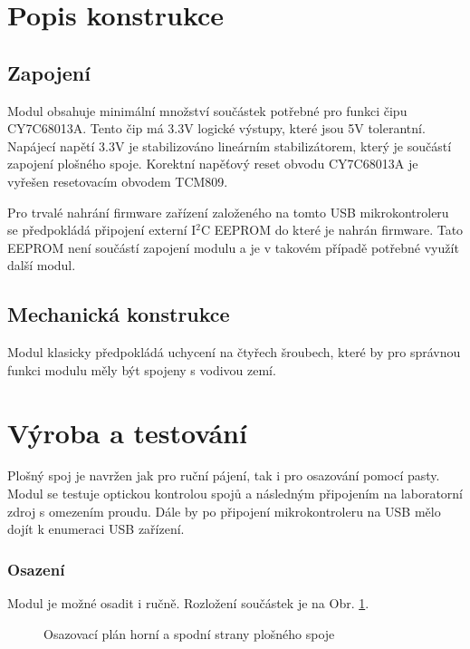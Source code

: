 \documentclass[12pt,a4paper,oneside]{article}
\begin{document}
\section{Popis konstrukce}

\subsection{Zapojení}

Modul obsahuje minimální množství součástek potřebné pro funkci čipu CY7C68013A. Tento čip má 3.3V logické výstupy, které jsou 5V tolerantní. Napájecí napětí 3.3V je stabilizováno lineárním stabilizátorem, který je součástí zapojení plošného spoje. Korektní napěťový reset obvodu CY7C68013A je vyřešen resetovacím obvodem TCM809. 



Pro trvalé nahrání firmware zařízení založeného na tomto USB mikrokontroleru se předpokládá připojení externí I$^2$C EEPROM do které je nahrán firmware. Tato EEPROM není součástí zapojení modulu a je v takovém případě potřebné využít další modul.


\subsection{Mechanická konstrukce}

Modul klasicky předpokládá uchycení na čtyřech šroubech, které by pro správnou funkci modulu měly být spojeny s vodivou zemí.  

\section{Výroba a testování}

Plošný spoj je navržen jak pro ruční pájení, tak i pro osazování pomocí pasty.  Modul se testuje optickou kontrolou spojů a následným připojením na laboratorní zdroj s omezením proudu. Dále by po připojení mikrokontroleru na USB mělo dojít k enumeraci USB zařízení. 

\subsubsection{Osazení}

Modul je možné osadit i ručně. Rozložení součástek je na Obr. \ref{fig:osazovaci_plan}. 

\begin{figure} [h!tbp]
  \centering
  \caption{Osazovací plán horní a spodní strany plošného spoje}
  \label{fig:osazovaci_plan}
\end{figure}
\end{document}

